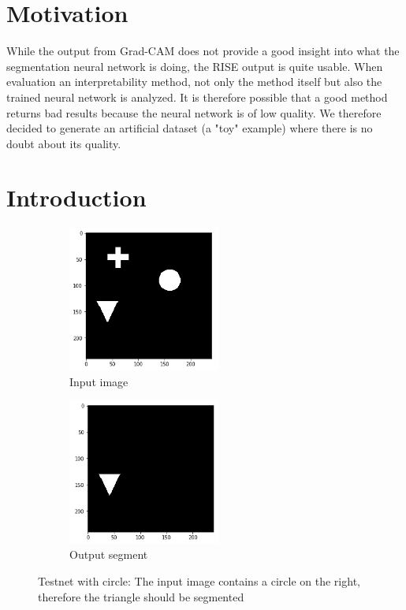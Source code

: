 \section{Motivation}
While the output from Grad-CAM does not provide a good insight into what the segmentation neural network is doing, the RISE output is quite usable. When evaluation an interpretability method, not only the method itself but also the trained neural network is analyzed. It is therefore possible that a good method returns bad results because the neural network is of low quality. We therefore decided to generate an artificial dataset (a "toy" example) where there is no doubt about its quality.


\section{Introduction}


\begin{figure}[H]
    \centering
    \begin{subfigure}{.5\textwidth}
        \centering
        \includegraphics[width=5cm]{chapters/05_testnet/images/testnet_a-0.png}
        \caption{Input image}
    \end{subfigure}%
    \begin{subfigure}{.5\textwidth}
        \centering
        \includegraphics[width=5cm]{chapters/05_testnet/images/testnet_a-1.png}
        \caption{Output segment}
    \end{subfigure}
    \caption{Testnet with circle: The input image contains a circle on the right, therefore the triangle should be segmented}
\end{figure}


